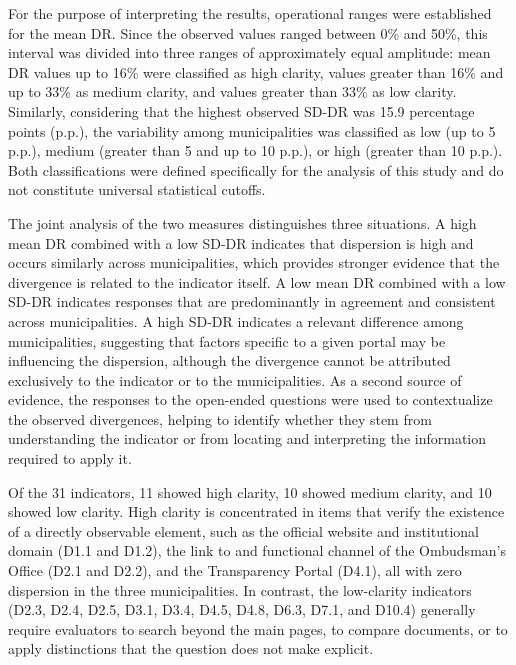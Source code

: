 \documentclass[12pt]{article}
\begin{document}
For the purpose of interpreting the results, operational ranges were established for the mean DR. Since the observed values ranged between 0\% and 50\%, this interval was divided into three ranges of approximately equal amplitude: mean DR values up to 16\% were classified as high clarity, values greater than 16\% and up to 33\% as medium clarity, and values greater than 33\% as low clarity. Similarly, considering that the highest observed SD-DR was 15.9 percentage points (p.p.), the variability among municipalities was classified as low (up to 5 p.p.), medium (greater than 5 and up to 10 p.p.), or high (greater than 10 p.p.). Both classifications were defined specifically for the analysis of this study and do not constitute universal statistical cutoffs.

The joint analysis of the two measures distinguishes three situations. A high mean DR combined with a low SD-DR indicates that dispersion is high and occurs similarly across municipalities, which provides stronger evidence that the divergence is related to the indicator itself. A low mean DR combined with a low SD-DR indicates responses that are predominantly in agreement and consistent across municipalities. A high SD-DR indicates a relevant difference among municipalities, suggesting that factors specific to a given portal may be influencing the dispersion, although the divergence cannot be attributed exclusively to the indicator or to the municipalities. As a second source of evidence, the responses to the open-ended questions were used to contextualize the observed divergences, helping to identify whether they stem from understanding the indicator or from locating and interpreting the information required to apply it.

Of the 31 indicators, 11 showed high clarity, 10 showed medium clarity, and 10 showed low clarity. High clarity is concentrated in items that verify the existence of a directly observable element, such as the official website and institutional domain (D1.1 and D1.2), the link to and functional channel of the Ombudsman's Office (D2.1 and D2.2), and the Transparency Portal (D4.1), all with zero dispersion in the three municipalities. In contrast, the low-clarity indicators (D2.3, D2.4, D2.5, D3.1, D3.4, D4.5, D4.8, D6.3, D7.1, and D10.4) generally require evaluators to search beyond the main pages, to compare documents, or to apply distinctions that the question does not make explicit.
\end{document}
